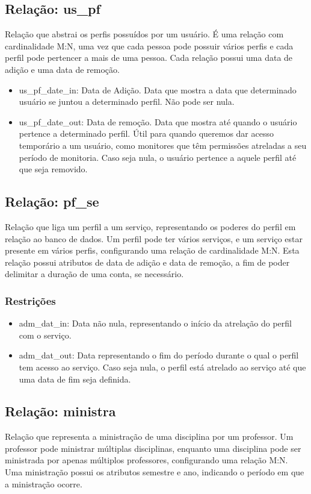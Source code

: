 \documentclass{article}
\begin{document}
    \subsection{Relação: us\_pf}
        \quad Relação que abstrai os perfis possuídos por um usuário. É uma relação com cardinalidade M:N, uma vez que cada pessoa pode possuir vários perfis e cada perfil pode pertencer a mais de uma pessoa.
        \quad Cada relação possui uma data de adição e uma data de remoção.
        \begin{itemize}
            \item us\_pf\_date\_in: Data de Adição. Data que mostra a data que determinado usuário se juntou a determinado perfil. Não pode ser nula.
            \item us\_pf\_date\_out: Data de remoção. Data que mostra até quando o usuário pertence a determinado perfil. Útil para quando queremos dar acesso temporário a um usuário, como monitores que têm permissões atreladas a seu período de monitoria. Caso seja nula, o usuário pertence a aquele perfil até que seja removido.
        \end{itemize}
        
    \subsection{Relação: pf\_se}
        \quad Relação que liga um perfil a um serviço, representando os poderes do perfil em relação ao banco de dados. Um perfil pode ter vários serviços, e um serviço estar presente em vários perfis, configurando uma relação de cardinalidade M:N.
        \quad Esta relação possui atributos de data de adição e data de remoção, a fim de poder delimitar a duração de uma conta, se necessário.
        \subsubsection{Restrições}
            \begin{itemize}
                \item adm\_dat\_in: Data não nula, representando o início da atrelação do perfil com o serviço.
                \item adm\_dat\_out: Data representando o fim do período durante o qual o perfil tem acesso ao serviço. Caso seja nula, o perfil está atrelado ao serviço até que uma data de fim seja definida.
            \end{itemize}
    
    \subsection{Relação: ministra}
        \quad Relação que representa a ministração de uma disciplina por um professor. Um professor pode ministrar múltiplas disciplinas, enquanto uma disciplina pode ser ministrada por apenas múltiplos professores, configurando uma relação M:N. \\
        \quad Uma ministração possui os atributos semestre e ano, indicando o período em que a ministração ocorre.
\end{document}
